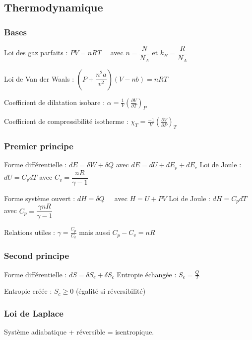 \documentclass[9pt,twocolumn]{article}
\begin{document}
\setlength{\columnseprule}{0.1pt}
\begin{center}
\part*{Thermodynamique}
\end{center}
\section{Bases}
Loi des gaz parfaits : $\boxed{PV=nRT}$  $\>\>\>$ avec $n=\dfrac{N}{N_A}$ et $k_B=\dfrac{R}{N_A}$

Loi de Van der Waals : $(P+\dfrac{n^2a}{v^2})(V-nb)=nRT$ 

\medbreak
Coefficient de dilatation isobare : 
$\alpha=\frac{1}{V} \left( \frac{\partial V}{\partial T} \right) _P$

Coefficient de compressibilité isotherme : 
$\chi _T=\frac{-1}{V} \left( \frac{\partial V}{\partial P} \right) _T$

\section{Premier principe}

Forme différentielle : $\boxed{dE=\delta W+\delta Q}$ 
\smallbreak
avec $dE=dU+dE_p+dE_c$
\medbreak
Loi de Joule : $dU=C_v dT$ avec $ C_v=\dfrac{nR}{\gamma-1}$


\bigbreak

Forme système ouvert : $\boxed{dH=\delta Q} \>\>\>\>\>$ avec $H=U+PV$
\smallbreak
Loi de Joule : $dH=C_p dT$ avec $ C_p=\dfrac{\gamma nR}{\gamma-1}$ 

Relations utiles : $\gamma =\frac{C_p}{C_v}$ mais aussi $C_p-C_v=nR$


\section{Second principe}

Forme différentielle : $\boxed{dS=\delta S_e+\delta S_c}$ 
\medbreak
Entropie échangée : $S_e=\frac{Q}{T}$

Entropie créée : $S_c\geq0$ (égalité si réversibilité)

\section{Loi de Laplace}

Système adiabatique + réversible = isentropique.
\end{document}
